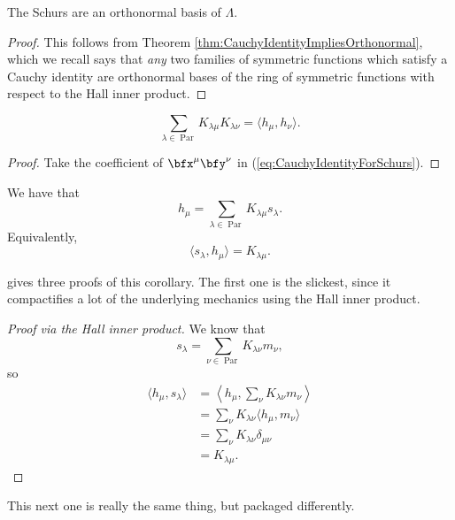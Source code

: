 \documentclass{article}
\DeclareMathOperator{\Par}{Par}
\begin{document}
\begin{corollary}
    The Schurs are an orthonormal basis of $\Lambda$.
\end{corollary}

\begin{proof}
    This follows from Theorem \ref{thm:CauchyIdentityImpliesOrthonormal}, which we recall says that \textit{any} two families of symmetric functions which satisfy a Cauchy identity are orthonormal bases of the ring of symmetric functions with respect to the Hall inner product.
\end{proof}

\begin{corollary}
    \[
        \sum_{\lambda \in \Par} K_{\lambda\mu}K_{\lambda\nu} = \langle h_\mu, h_\nu \rangle.
    \]
\end{corollary}

\begin{proof}
    Take the coefficient of $\bfx^\mu \bfy^\nu$ in (\ref{eq:CauchyIdentityForSchurs}).
\end{proof}

\begin{corollary}\label{thm:HToSIsKostka}
    We have that
    \[
        h_\mu = \sum_{\lambda \in \Par} K_{\lambda\mu}s_\lambda.
    \]
    Equivalently,
    \[
        \langle s_\lambda, h_\mu \rangle = K_{\lambda\mu}.
    \]
\end{corollary}

\cite{StanleyEC2} gives three proofs of this corollary. The first one is the slickest, since it compactifies a lot of the underlying mechanics using the Hall inner product.

\begin{proof}[Proof via the Hall inner product]
    We know that
    \[
        s_\lambda = \sum_{\nu\in\Par} K_{\lambda\nu} m_\nu,
    \]
    so 
    \begin{align*}
        \langle h_\mu, s_\lambda \rangle &= \left\langle h_\mu, \sum_\nu K_{\lambda\nu} m_\nu \right\rangle \\
                                         &=\sum_{\nu} K_{\lambda\nu} \langle h_\mu, m_\nu \rangle \\
                                         &=\sum_{\nu} K_{\lambda\nu} \delta_{\mu\nu} \\
                                         &= K_{\lambda\mu}.
    \end{align*}
\end{proof}

This next one is really the same thing, but packaged differently.
\end{document}

